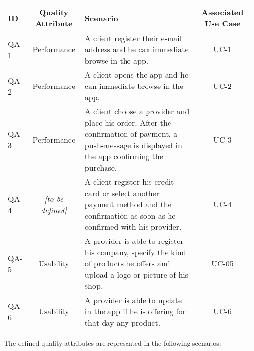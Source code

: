 \begin{table}[H]
    \begin{tabularx}{\textwidth}{lcXc}
        \toprule
        ID & Quality Attribute & Scenario & Associated Use Case  \\
        \midrule
        QA-1 & Performance & A \gls{client} register their e-mail address and he can immediate browse in the app. & UC-1 \\
        QA-2 & Performance & A \gls{client} opens the app and he can immediate browse in the app. & UC-2 \\
        QA-3 & Performance & A \gls{client} choose a \gls{provider} and place his order. After the confirmation
        of payment, a push-message is displayed in the app confirming the purchase. & UC-3 \\
        QA-4 & \textit{[to be defined]} & A \gls{client}  register his credit card or select another payment method and the
        confirmation as soon as he confirmed with his \gls{provider}. & UC-4 \\
        QA-5 & Usability & A \gls{provider} is able to register his company, specify the kind of products he offers and upload
        a logo or picture of his shop. & UC-05 \\
        QA-6 & Usability & A \gls{provider} is able to update in the app if he is offering for that day any product. &  UC-6 \\
        \bottomrule
    \end{tabularx}
\end{table}

The defined quality attributes are represented in the following scenarios:

